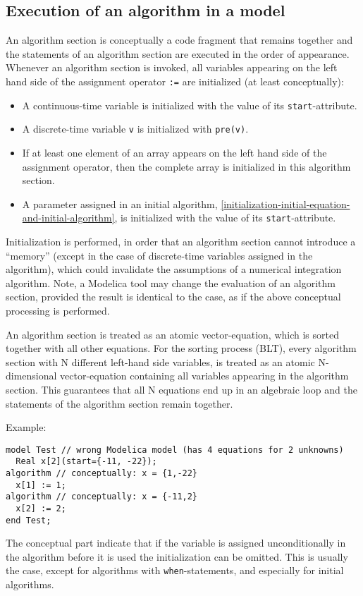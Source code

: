 \subsection{Execution of an algorithm in a model}\label{execution-of-an-algorithm-in-a-model}

An algorithm section is conceptually a code fragment that remains
together and the statements of an algorithm section are executed in the
order of appearance. Whenever an algorithm section is invoked, all
variables appearing on the left hand side of the assignment operator
\lstinline!:=! are initialized (at least conceptually):
\begin{itemize}
\item
  A continuous-time variable is initialized with the value of its \lstinline!start!-attribute.
\item
  A discrete-time variable \lstinline!v! is initialized with \lstinline!pre(v)!.
\item
  If at least one element of an array appears on the left hand side of the assignment operator, then the complete array is initialized in this algorithm section.
\item
  A parameter assigned in an initial algorithm, \cref{initialization-initial-equation-and-initial-algorithm}, is initialized with the value of its \lstinline!start!-attribute.
\end{itemize}

\begin{nonnormative}
Initialization is performed, in order that an algorithm section
cannot introduce a ``memory'' (except in the case of discrete-time variables assigned in the algorithm), which could invalidate the assumptions of a
numerical integration algorithm. Note, a Modelica tool may change the
evaluation of an algorithm section, provided the result is identical to
the case, as if the above conceptual processing is performed.

An algorithm section is treated as an atomic vector-equation,
which is sorted together with all other equations. For the sorting
process (BLT), every algorithm section with N different left-hand side
variables, is treated as an atomic N-dimensional vector-equation
containing all variables appearing in the algorithm section. This
guarantees that all N equations end up in an algebraic loop and the
statements of the algorithm section remain together.

Example:
\begin{lstlisting}[language=modelica]
model Test // wrong Modelica model (has 4 equations for 2 unknowns)
  Real x[2](start={-11, -22});
algorithm // conceptually: x = {1,-22}
  x[1] := 1;
algorithm // conceptually: x = {-11,2}
  x[2] := 2;
end Test;
\end{lstlisting}

The conceptual part indicate that if the variable is assigned unconditionally in the algorithm before it is used the initialization can be omitted.
This is usually the case, except for algorithms with \lstinline!when!-statements, and especially for initial algorithms.
\end{nonnormative}

